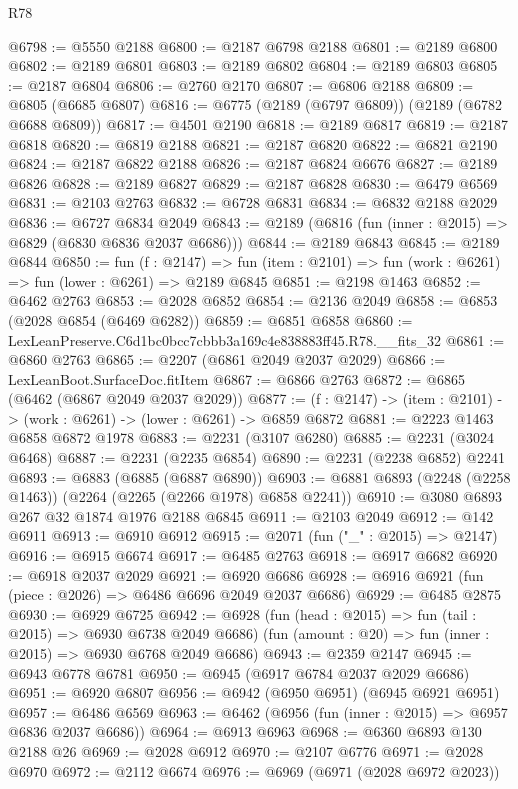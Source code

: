 \begin{lexlean}{R78}
\begin{coremodule}
@6798 := @5550 @2188
@6800 := @2187 @6798 @2188
@6801 := @2189 @6800
@6802 := @2189 @6801
@6803 := @2189 @6802
@6804 := @2189 @6803
@6805 := @2187 @6804
@6806 := @2760 @2170
@6807 := @6806 @2188
@6809 := @6805 (@6685 @6807)
@6816 := @6775 (@2189 (@6797 @6809)) (@2189 (@6782 @6688 @6809))
@6817 := @4501 @2190
@6818 := @2189 @6817
@6819 := @2187 @6818
@6820 := @6819 @2188
@6821 := @2187 @6820
@6822 := @6821 @2190
@6824 := @2187 @6822 @2188
@6826 := @2187 @6824 @6676
@6827 := @2189 @6826
@6828 := @2189 @6827
@6829 := @2187 @6828
@6830 := @6479 @6569
@6831 := @2103 @2763
@6832 := @6728 @6831
@6834 := @6832 @2188 @2029
@6836 := @6727 @6834 @2049
@6843 := @2189 (@6816 (fun (inner : @2015) => @6829 (@6830 @6836 @2037 @6686)))
@6844 := @2189 @6843
@6845 := @2189 @6844
@6850 := fun (f : @2147) =>
  fun (item : @2101) => fun (work : @6261) => fun (lower : @6261) => @2189 @6845
@6851 := @2198 @1463
@6852 := @6462 @2763
@6853 := @2028 @6852
@6854 := @2136 @2049
@6858 := @6853 (@2028 @6854 (@6469 @6282))
@6859 := @6851 @6858
@6860 := LexLeanPreserve.C6d1bc0bcc7cbbb3a169c4e838883ff45.R78.__fits_32
@6861 := @6860 @2763
@6865 := @2207 (@6861 @2049 @2037 @2029)
@6866 := LexLeanBoot.SurfaceDoc.fitItem
@6867 := @6866 @2763
@6872 := @6865 (@6462 (@6867 @2049 @2037 @2029))
@6877 := (f : @2147) -> (item : @2101) -> (work : @6261) -> (lower : @6261) -> @6859 @6872
@6881 := @2223 @1463 @6858 @6872 @1978
@6883 := @2231 (@3107 @6280)
@6885 := @2231 (@3024 @6468)
@6887 := @2231 (@2235 @6854)
@6890 := @2231 (@2238 @6852) @2241
@6893 := @6883 (@6885 (@6887 @6890))
@6903 := @6881 @6893 (@2248 (@2258 @1463)) (@2264 (@2265 (@2266 @1978) @6858 @2241))
@6910 := @3080 @6893 @267 @32 @1874 @1976 @2188 @6845
@6911 := @2103 @2049
@6912 := @142 @6911
@6913 := @6910 @6912
@6915 := @2071 (fun ("_" : @2015) => @2147)
@6916 := @6915 @6674
@6917 := @6485 @2763
@6918 := @6917 @6682
@6920 := @6918 @2037 @2029
@6921 := @6920 @6686
@6928 := @6916 @6921 (fun (piece : @2026) => @6486 @6696 @2049 @2037 @6686)
@6929 := @6485 @2875
@6930 := @6929 @6725
@6942 := @6928
    (fun (head : @2015) => fun (tail : @2015) => @6930 @6738 @2049 @6686)
    (fun (amount : @20) => fun (inner : @2015) => @6930 @6768 @2049 @6686)
@6943 := @2359 @2147
@6945 := @6943 @6778 @6781
@6950 := @6945 (@6917 @6784 @2037 @2029 @6686)
@6951 := @6920 @6807
@6956 := @6942 (@6950 @6951) (@6945 @6921 @6951)
@6957 := @6486 @6569
@6963 := @6462 (@6956 (fun (inner : @2015) => @6957 @6836 @2037 @6686))
@6964 := @6913 @6963
@6968 := @6360 @6893 @130 @2188 @26
@6969 := @2028 @6912
@6970 := @2107 @6776
@6971 := @2028 @6970
@6972 := @2112 @6674
@6976 := @6969 (@6971 (@2028 @6972 @2023))

\end{coremodule}
\end{lexlean}
